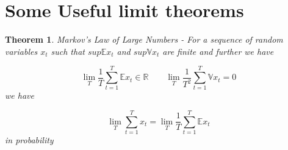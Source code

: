 \documentclass[12pt]{article}
\newtheorem{theorem}{Theorem}
\begin{document}
\section{Some Useful limit theorems}
\begin{theorem}
Markov's Law of Large Numbers - For a sequence of random variables $x_t$ such that $sup \mathbb{E}x_t$ and $sup \mathbb{V}x_t$ are finite	 and further we have

\[\lim_{T}\frac{1}{T}\sum_{t=1}^{T}\mathbb{E}x_t \in \mathbb{R} \quad \quad \lim_{T}\frac{1}{T^2}\sum_{t=1}^{T}\mathbb{V}x_t =0\]
we have

\[\lim_{T}\sum_{t=1}^{T}x_t = \lim_T \frac{1}{T}\sum_{t=1}^{T} \mathbb{E}x_t\] in probability

\end{theorem}
\end{document}
